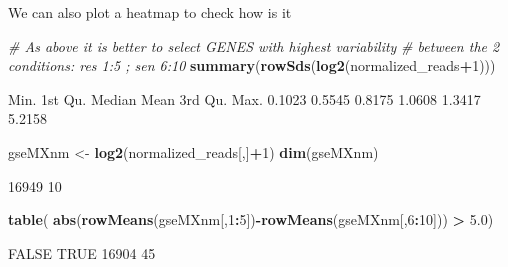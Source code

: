 \documentclass[
]{article}
\newenvironment{Shaded}{\begin{snugshade}}{\end{snugshade}}
\newcommand{\CommentTok}[1]{\textcolor[rgb]{0.56,0.35,0.01}{\textit{#1}}}
\newcommand{\DecValTok}[1]{\textcolor[rgb]{0.00,0.00,0.81}{#1}}
\newcommand{\FloatTok}[1]{\textcolor[rgb]{0.00,0.00,0.81}{#1}}
\newcommand{\FunctionTok}[1]{\textcolor[rgb]{0.13,0.29,0.53}{\textbf{#1}}}
\newcommand{\NormalTok}[1]{#1}
\newcommand{\OtherTok}[1]{\textcolor[rgb]{0.56,0.35,0.01}{#1}}
\newcommand{\SpecialCharTok}[1]{\textcolor[rgb]{0.81,0.36,0.00}{\textbf{#1}}}
\begin{document}
We can also plot a heatmap to check how is it

\begin{Shaded}
\begin{Highlighting}[]
\CommentTok{\# As above it is better to select GENES with highest variability }
\CommentTok{\# between the 2 conditions: res 1:5 ; sen 6:10}
\FunctionTok{summary}\NormalTok{(}\FunctionTok{rowSds}\NormalTok{(}\FunctionTok{log2}\NormalTok{(normalized\_reads}\SpecialCharTok{+}\DecValTok{1}\NormalTok{)))}
\end{Highlighting}
\end{Shaded}

\begin{Shaded}
\begin{Highlighting}[]
\NormalTok{   Min. 1st Qu.  Median    Mean 3rd Qu.    Max. }
\NormalTok{ 0.1023  0.5545  0.8175  1.0608  1.3417  5.2158 }
\end{Highlighting}
\end{Shaded}

\begin{Shaded}
\begin{Highlighting}[]
\NormalTok{gseMXnm }\OtherTok{\textless{}{-}} \FunctionTok{log2}\NormalTok{(normalized\_reads[,]}\SpecialCharTok{+}\DecValTok{1}\NormalTok{)}
\FunctionTok{dim}\NormalTok{(gseMXnm)}
\end{Highlighting}
\end{Shaded}

\begin{Shaded}
\begin{Highlighting}[]
\NormalTok{[1] 16949    10}
\end{Highlighting}
\end{Shaded}

\begin{Shaded}
\begin{Highlighting}[]
\FunctionTok{table}\NormalTok{( }\FunctionTok{abs}\NormalTok{(}\FunctionTok{rowMeans}\NormalTok{(gseMXnm[,}\DecValTok{1}\SpecialCharTok{:}\DecValTok{5}\NormalTok{])}\SpecialCharTok{{-}}\FunctionTok{rowMeans}\NormalTok{(gseMXnm[,}\DecValTok{6}\SpecialCharTok{:}\DecValTok{10}\NormalTok{])) }\SpecialCharTok{\textgreater{}} \FloatTok{5.0}\NormalTok{)}
\end{Highlighting}
\end{Shaded}

\begin{Shaded}
\begin{Highlighting}[]
\NormalTok{FALSE  TRUE }
\NormalTok{16904    45 }
\end{Highlighting}
\end{Shaded}
\end{document}
